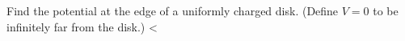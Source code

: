         Find the potential at the edge of a uniformly charged
        disk. (Define $V=0$ to be infinitely far from the disk.)
        \answercheck<%
